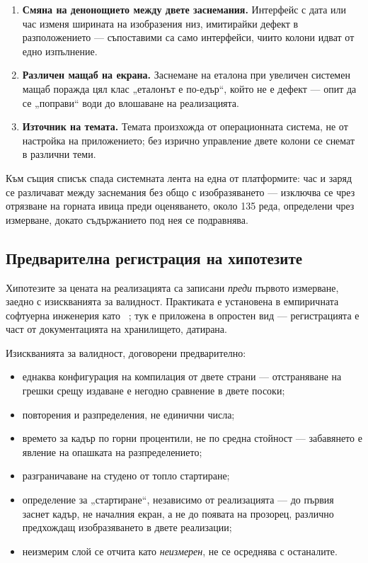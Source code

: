 \begin{enumerate}[topsep=2pt,itemsep=1pt,leftmargin=*]
\item \textbf{Смяна на денонощието между двете заснемания.} Интерфейс с дата или час
      изменя ширината на изобразения низ, имитирайки дефект в разположението ---
      съпоставими са само интерфейси, чиито колони идват от едно изпълнение.
\item \textbf{Различен мащаб на екрана.} Заснемане на еталона при увеличен системен
      мащаб поражда цял клас „еталонът е по-едър“, който не е дефект --- опит да се
      „поправи“ води до влошаване на реализацията.
\item \textbf{Източник на темата.} Темата произхожда от операционната система, не от
      настройка на приложението; без изрично управление двете колони се снемат в
      различни теми.
\end{enumerate}

Към същия списък спада системната лента на една от платформите: час и заряд се
различават между заснемания без общо с изобразяването --- изключва се чрез отрязване
на горната ивица преди оценяването, около 135 реда, определени чрез измерване, докато
съдържанието под нея се подравнява.

\subsection{Предварителна регистрация на хипотезите}
\label{subsec:preregistration}

Хипотезите за цената на реализацията са записани \emph{преди} първото измерване, заедно
с изискванията за валидност. Практиката е установена в емпиричната софтуерна
инженерия като ~\cite{ernst2023registered}; тук е приложена в
опростен вид --- регистрацията е част от документацията на хранилището, датирана.

Изискванията за валидност, договорени предварително:

\begin{itemize}[topsep=2pt,itemsep=1pt,leftmargin=*]
\item еднаква конфигурация на компилация от двете страни --- отстраняване на грешки
      срещу издаване е негодно сравнение в двете посоки;
\item повторения и разпределения, не единични числа;
\item времето за кадър по горни процентили, не по средна стойност --- забавянето е
      явление на опашката на разпределението;
\item разграничаване на студено от топло стартиране;
\item определение за „стартиране“, независимо от реализацията --- до първия заснет
      кадър, не началния екран, а не до появата на прозорец, различно предхождащ
      изобразяването в двете реализации;
\item неизмерим слой се отчита като \emph{неизмерен}, не се осреднява с останалите.
\end{itemize}

